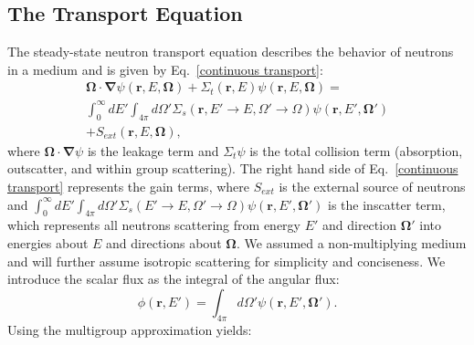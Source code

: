 \documentclass{anstrans}
\renewcommand{\vec}[1]{\bm{#1}} %
\newcommand{\vr}{\vec{r}}
\newcommand{\vo}{\vec{\Omega}}
\begin{document}
\subsection{The Transport Equation}
The steady-state neutron transport equation describes the behavior of neutrons in a medium and is given by Eq.~\eqref{continuous transport}:
\begin{multline}
\vo \cdot \vec \nabla \psi(\vr,E,\vo) +\Sigma_t(\vr,E) \psi(\vr,E,\vo)  = \\
\int_{0}^{\infty}dE' \int_{4\pi}d\Omega' \Sigma_s(\vr,E'\to E, \Omega'\to\Omega)\psi(\vr,E',\vo') 
\\+ S_{ext}(\vr,E,\vo) ,
\label{continuous transport}
\end{multline}
where $\vec{\Omega}\cdot \vec\nabla\psi$ is the leakage term and $\Sigma_t\psi$ is the total collision term (absorption, outscatter, and within group scattering). The right hand side of Eq.~\eqref{continuous transport} represents the gain terms, where $S_{ext}$ is the external source of neutrons and $\int_{0}^{\infty}dE'\int_{4\pi}d\Omega'\Sigma_s(E'\to E, \Omega'\to\Omega)\psi(\vr,E',\vo')$ is the inscatter term, which represents all neutrons scattering from energy $E'$ and direction $\vo'$ into energies about $E$ and directions about $\vo$. 
%
We assumed a non-multiplying medium and will further assume isotropic scattering for simplicity and conciseness. 
We introduce the scalar flux as the integral of the angular flux:
\begin{equation}
\label{def_scalar_flux}
\phi(\vr,E') = \int_{4\pi}d\Omega' \psi(\vr,E',\vo').
\end{equation}
Using the multigroup approximation yields:
\end{document}
